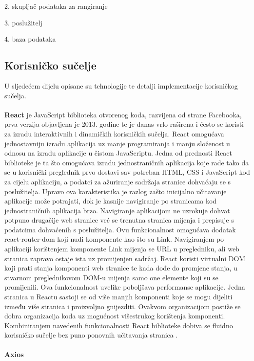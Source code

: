 \documentclass[times, utf8, zavrsni]{fer}
\begin{document}
2. skupljač podataka za rangiranje

3. poslužitelj

4. baza podataka

\subsection{Korisničko sučelje}
U sljedećem dijelu opisane su tehnologije te detalji implementacije korisničkog sučelja.
\\
\\ \textbf{React} je JavaScript biblioteka otvorenog koda, razvijena od strane Facebooka,
prva verzija objavljena je 2013. godine te je danas vrlo raširena i često se koristi za izradu interaktivnih i dinamičkih korisničkih sučelja. 
React omogućava jednostavniju izradu aplikacija uz manje programiranja i manju složenost u odnosu na izradu aplikacije u čistom JavaScriptu.
Jedna od prednosti React biblioteke je ta što omogućava izradu jednostraničnih aplikacija  koje rade tako 
da se u korisnički preglednik prvo dostavi 
sav potreban HTML, CSS i JavaScript kod za cijelu aplikaciju, a podatci za ažuriranje sadržaja stranice dohvaćaju se 
s poslužitelja. Upravo ova karakteristika je razlog zašto inicijalno učitavanje aplikacije može potrajati, dok je kasnije navigiranje po stranicama kod jednostraničnih aplikacija brzo.
Navigiranje aplikacijom ne uzrokuje dohvat potpuno drugačije web stranice već se trenutna stranica 
mijenja i prepisuje s podatcima dohvaćenih s poslužitelja. Ovu funkcionalnost omogućava dodatak react-router-dom koji nudi komponente kao što su Link.
Navigiranjem po aplikaciji korištenjem komponente Link mijenja se URL u pregledniku, ali web stranica zapravo ostaje ista uz promijenjen sadržaj.
React koristi virtualni DOM  koji prati stanja 
komponenti web stranice te kada dođe do promjene stanja, u stvarnom preglednikovom DOM-u mijenja samo one elemente koji su se promijenili. Ova 
funkcionalnost uvelike poboljšava performanse aplikacije.
Jedna stranica u Reactu sastoji se od više manjih komponenti koje se mogu dijeliti \\između više stranica i proizvoljno gnijezditi. Ovakvom organizacijom
postiže se dobra organizacija koda uz mogućnost višestrukog korištenja komponenti.
Kombiniranjem navedenih funkcionalnosti React biblioteke dobiva se fluidno korisničko sučelje bez puno ponovnih učitavanja stranica .
\\
\\ \textbf{Axios}
\end{document}
